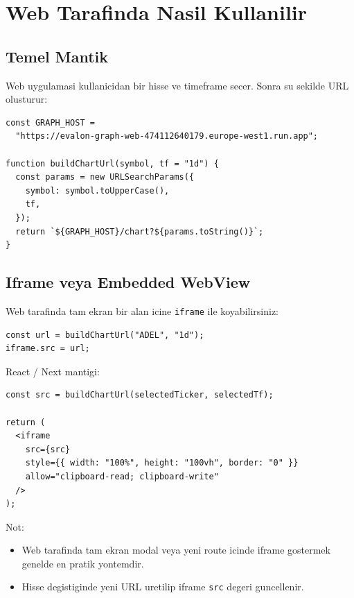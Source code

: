 \documentclass[11pt,a4paper]{article}
\begin{document}
\section{Web Tarafinda Nasil Kullanilir}

\subsection{Temel Mantik}

Web uygulamasi kullanicidan bir hisse ve timeframe secer. Sonra su sekilde URL olusturur:

\begin{lstlisting}[style=evalon]
const GRAPH_HOST =
  "https://evalon-graph-web-474112640179.europe-west1.run.app";

function buildChartUrl(symbol, tf = "1d") {
  const params = new URLSearchParams({
    symbol: symbol.toUpperCase(),
    tf,
  });
  return `${GRAPH_HOST}/chart?${params.toString()}`;
}
\end{lstlisting}

\subsection{Iframe veya Embedded WebView}

Web tarafinda tam ekran bir alan icine \texttt{iframe} ile koyabilirsiniz:

\begin{lstlisting}[style=evalon]
const url = buildChartUrl("ADEL", "1d");
iframe.src = url;
\end{lstlisting}

React / Next mantigi:

\begin{lstlisting}[style=evalon]
const src = buildChartUrl(selectedTicker, selectedTf);

return (
  <iframe
    src={src}
    style={{ width: "100%", height: "100vh", border: "0" }}
    allow="clipboard-read; clipboard-write"
  />
);
\end{lstlisting}

Not:

\begin{itemize}
  \item Web tarafinda tam ekran modal veya yeni route icinde iframe gostermek genelde en pratik yontemdir.
  \item Hisse degistiginde yeni URL uretilip iframe \texttt{src} degeri guncellenir.
\end{itemize}
\end{document}
